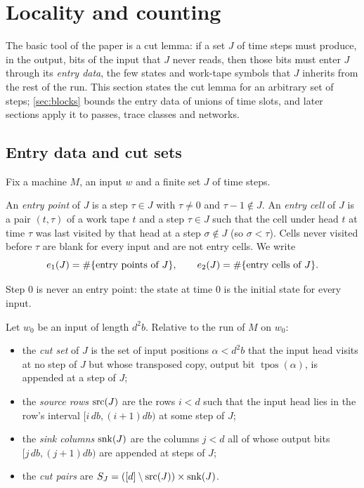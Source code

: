 \section{Locality and counting}\label{sec:locality}

The basic tool of the paper is a cut lemma: if a set $J$ of time steps must produce, in the
output, bits of the input that $J$ never reads, then those bits must enter $J$ through its
\emph{entry data}, the few states and work-tape symbols that $J$ inherits from the rest of the
run. This section states the cut lemma for an arbitrary set of steps; \cref{sec:blocks} bounds the
entry data of unions of time slots, and later sections apply it to passes, trace classes and
networks.

\subsection{Entry data and cut sets}

Fix a machine $M$, an input $w$ and a finite set $J$ of time steps.

\begin{definition}\label{def:entry}
An \emph{entry point} of $J$ is a step $\tau\in J$ with $\tau\ne0$ and $\tau-1\notin J$. An
\emph{entry cell} of $J$ is a pair $(t,\tau)$ of a work tape $t$ and a step $\tau\in J$ such that
the cell under head $t$ at time $\tau$ was last visited by that head at a step $\sigma\notin J$
(so $\sigma<\tau$). Cells never visited before $\tau$ are blank for every input and are not entry
cells. We write
\[
  e_1(J)=\#\{\text{entry points of }J\},\qquad e_2(J)=\#\{\text{entry cells of }J\}.
\]
\end{definition}

Step $0$ is never an entry point: the state at time $0$ is the initial state for every input.

\begin{definition}\label{def:cut}
Let $w_0$ be an input of length $d^2b$. Relative to the run of $M$ on $w_0$:
\begin{itemize}[leftmargin=2em]
\item the \emph{cut set} of $J$ is the set of input positions $\alpha<d^2b$ that the input head visits
at no step of $J$ but whose transposed copy, output bit $\operatorname{tpos}(\alpha)$, is appended at a
step of $J$;
\item the \emph{source rows} $\mathrm{src}(J)$ are the rows $i<d$ such that the input head lies in the
row's interval $[i\,db,(i+1)db)$ at some step of $J$;
\item the \emph{sink columns} $\mathrm{snk}(J)$ are the columns $j<d$ all of whose output bits
$[j\,db,(j+1)db)$ are appended at steps of $J$;
\item the \emph{cut pairs} are $S_J=([d]\setminus\mathrm{src}(J))\times\mathrm{snk}(J)$.
\end{itemize}
\end{definition}

